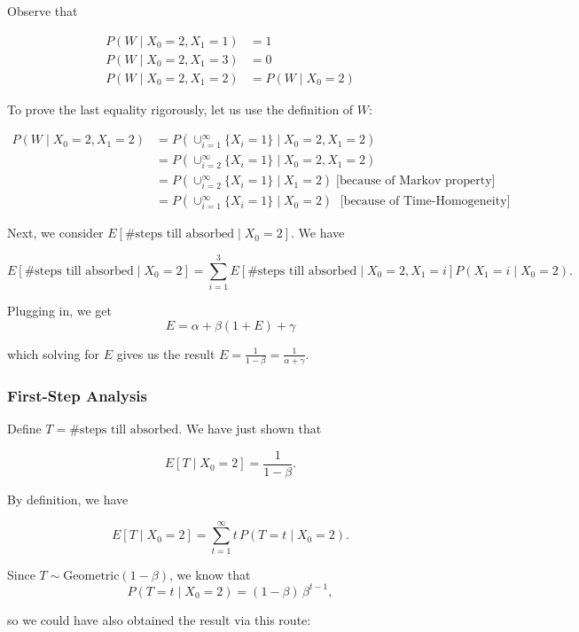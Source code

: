 \documentclass{article}
\theoremstyle{definition}
\begin{document}
Observe that 

\begin{align*}
 P(W \mid X_0 = 2, X_1 = 1) &= 1 \\
 P(W \mid X_0 = 2, X_1 = 3) &= 0 \\
  P(W \mid X_0 = 2, X_1 = 2) &=  P(W \mid X_0 = 2)
\end{align*}

To prove the last equality rigorously, let us use the definition of $W$:

\begin{align*}
  P(W \mid X_0 = 2, X_1 = 2) &= 
  P \left( \cup_{i=1}^\infty \{X_i = 1\}  \mid X_0 = 2, X_1 = 2 \right) \\ 
  &=  P \left( \cup_{i=2}^\infty \{X_i = 1\} \mid X_0 = 2, X_1 = 2 \right) \\
  &= P \left( \cup_{i=2}^\infty \{X_i = 1\} \mid X_1 = 2 \right ) \; \text{[because of Markov property]} \\
    &= P \left( \cup_{i=1}^\infty \{X_i = 1\} \mid X_0 = 2 \right) \; \text{ [because of Time-Homogeneity] }
\end{align*}

Next, we consider $E \left[ \text{\# steps till absorbed} \mid X_0 = 2 \right]$. We have

$$
E \left[ \text{\# steps till absorbed} \mid X_0 = 2 \right] = \sum_{i=1}^3 E \left[ \text{\# steps till absorbed} \mid X_0 = 2, X_1 = i \right] P(X_1 = i \mid X_0 = 2).
$$

Plugging in, we get
$$
E = \alpha + \beta (1 + E) + \gamma
$$

which solving for $E$ gives us the result $E= \frac{1}{1-\beta} = \frac{1}{\alpha + \gamma}$.

\subsubsection*{First-Step Analysis} 
Define $T = \text{\# steps till absorbed}$. We have just shown that 

$$
E\left[T \mid X_0 = 2 \right] =  \frac{1}{1-\beta}.
$$

By definition, we have

$$
E\left[T \mid X_0 = 2 \right] = \sum_{t=1}^\infty t \, P(T=t\mid X_0 = 2).
$$

Since $T \sim \text{Geometric}(1-\beta)$, we know that 
$$
P(T=t\mid X_0 = 2) = (1 - \beta)\,\beta^{t-1},
$$

so we could have also obtained the result via this route:
\end{document}
